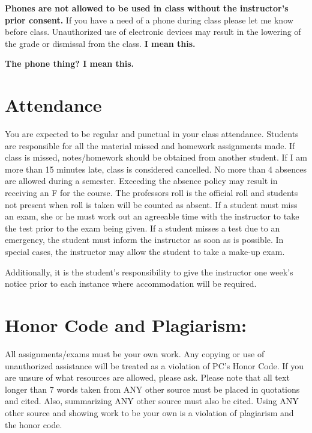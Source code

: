 \documentclass[
]{book}
\begin{document}
\textbf{Phones are not allowed to be used in class without the instructor's prior consent.} If you have a need of a phone during class please let me know before class. Unauthorized use of electronic devices may result in the lowering of the grade or dismissal from the class. \textbf{I mean this.}

\textbf{The phone thing? I mean this.}

\hypertarget{attendance}{%
\section{Attendance}\label{attendance}}

You are expected to be regular and punctual in your class attendance. Students are responsible for all the material missed and homework assignments made. If class is missed, notes/homework should be obtained from another student. If I am more than 15 minutes late, class is considered cancelled. No more than 4 absences are allowed during a semester. Exceeding the absence policy may result in receiving an F for the course. The professors roll is the official roll and students not present when roll is taken will be counted as absent. If a student must miss an exam, she or he must work out an agreeable time with the instructor to take the test prior to the exam being given. If a student misses a test due to an emergency, the student must inform the instructor as soon as is possible. In special cases, the instructor may allow the student to take a make-up exam.

Additionally, it is the student's responsibility to give the instructor one week's notice prior to each instance where accommodation will be required.

\hypertarget{honor-code-and-plagiarism}{%
\section{Honor Code and Plagiarism:}\label{honor-code-and-plagiarism}}

All assignments/exams must be your own work. Any copying or use of unauthorized assistance will be treated as a violation of PC's Honor Code. If you are unsure of what resources are allowed, please ask. Please note that all text longer than 7 words taken from ANY other source must be placed in quotations and cited. Also, summarizing ANY other source must also be cited. Using ANY other source and showing work to be your own is a violation of plagiarism and the honor code.
\end{document}
